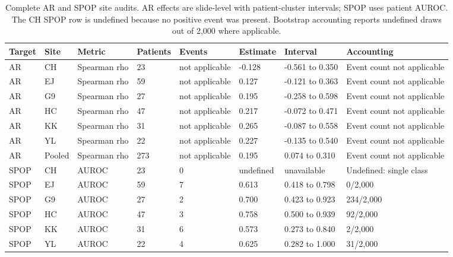 \begin{table}[H]
\centering
\scriptsize
\caption{Complete AR and SPOP site audits. AR effects are slide-level with patient-cluster intervals; SPOP uses patient AUROC. The CH SPOP row is undefined because no positive event was present. Bootstrap accounting reports undefined draws out of 2,000 where applicable.}
\label{tab:supp-site-audits}
\begin{tabular}{@{}p{}p{}p{}p{}p{}p{}p{}p{}@{}}
\toprule
Target & Site & Metric & Patients & Events & Estimate & Interval & Accounting \\
\midrule
AR & CH & Spearman rho & 23 & not applicable & -0.128 & -0.561 to 0.350 & Event count not applicable \\
AR & EJ & Spearman rho & 59 & not applicable & 0.127 & -0.121 to 0.363 & Event count not applicable \\
AR & G9 & Spearman rho & 27 & not applicable & 0.195 & -0.258 to 0.598 & Event count not applicable \\
AR & HC & Spearman rho & 47 & not applicable & 0.217 & -0.072 to 0.471 & Event count not applicable \\
AR & KK & Spearman rho & 31 & not applicable & 0.265 & -0.087 to 0.558 & Event count not applicable \\
AR & YL & Spearman rho & 22 & not applicable & 0.227 & -0.135 to 0.540 & Event count not applicable \\
AR & Pooled & Spearman rho & 273 & not applicable & 0.195 & 0.074 to 0.310 & Event count not applicable \\
SPOP & CH & AUROC & 23 & 0 & undefined & unavailable & Undefined: single class \\
SPOP & EJ & AUROC & 59 & 7 & 0.613 & 0.418 to 0.798 & 0/2,000 \\
SPOP & G9 & AUROC & 27 & 2 & 0.700 & 0.423 to 0.923 & 234/2,000 \\
SPOP & HC & AUROC & 47 & 3 & 0.758 & 0.500 to 0.939 & 92/2,000 \\
SPOP & KK & AUROC & 31 & 6 & 0.573 & 0.273 to 0.840 & 2/2,000 \\
SPOP & YL & AUROC & 22 & 4 & 0.625 & 0.282 to 1.000 & 31/2,000 \\
\bottomrule
\end{tabular}
\end{table}
